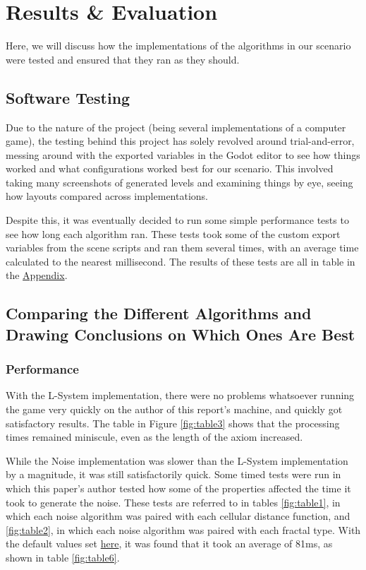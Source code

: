 \chapter{Results \& Evaluation} \label{Evaluation}

Here, we will discuss how the implementations of the algorithms in our scenario were tested and ensured that they ran as they should.

\section{Software Testing}

Due to the nature of the project (being several implementations of a computer game), the testing behind this project has solely revolved around trial-and-error, messing around with the exported variables in the Godot editor to see how things worked and what configurations worked best for our scenario. This involved taking many screenshots of generated levels and examining things by eye, seeing how layouts compared across implementations.

Despite this, it was eventually decided to run some simple performance tests to see how long each algorithm ran. These tests took some of the custom export variables from the scene scripts and ran them several times, with an average time calculated to the nearest millisecond. The results of these tests are all in table in the \hyperref[Appendix]{Appendix}.

\section{Comparing the Different Algorithms and Drawing Conclusions on Which Ones Are Best}

\subsection{Performance}

With the L-System implementation, there were no problems whatsoever running the game very quickly on the author of this report's machine, and quickly got satisfactory results. The table in Figure \ref{fig:table3} shows that the processing times remained miniscule, even as the length of the axiom increased.

While the Noise implementation was slower than the L-System implementation by a magnitude, it was still satisfactorily quick. Some timed tests were run in which this paper's author tested how some of the properties affected the time it took to generate the noise. These tests are referred to in tables \ref{fig:table1}, in which each noise algorithm was paired with each cellular distance function, and \ref{fig:table2}, in which each noise algorithm was paired with each fractal type. With the default values set \hyperref[noisedefaults]{here}, it was found that it took an average of 81ms, as shown in table \ref{fig:table6}.

